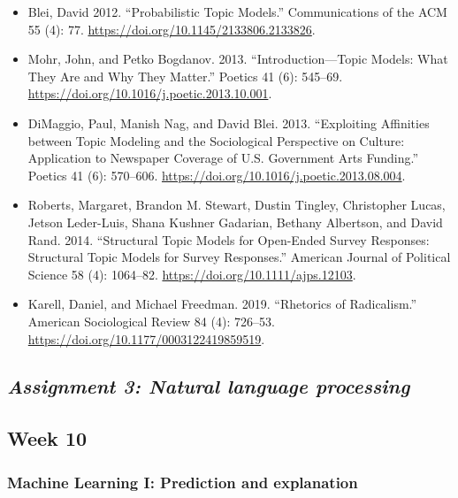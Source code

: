 \documentclass[
  10pt,
]{article}
\providecommand{\tightlist}{%
  \setlength{\itemsep}{0pt}\setlength{\parskip}{0pt}}
\begin{document}
\begin{itemize}
\tightlist
\item
  Blei, David 2012. ``Probabilistic Topic Models.'' Communications of
  the ACM 55 (4): 77. \url{https://doi.org/10.1145/2133806.2133826}.
\item
  Mohr, John, and Petko Bogdanov. 2013. ``Introduction---Topic Models:
  What They Are and Why They Matter.'' Poetics 41 (6): 545--69.
  \url{https://doi.org/10.1016/j.poetic.2013.10.001}.
\item
  DiMaggio, Paul, Manish Nag, and David Blei. 2013. ``Exploiting
  Affinities between Topic Modeling and the Sociological Perspective on
  Culture: Application to Newspaper Coverage of U.S. Government Arts
  Funding.'' Poetics 41 (6): 570--606.
  \url{https://doi.org/10.1016/j.poetic.2013.08.004}.
\item
  Roberts, Margaret, Brandon M. Stewart, Dustin Tingley, Christopher
  Lucas, Jetson Leder-Luis, Shana Kushner Gadarian, Bethany Albertson,
  and David Rand. 2014. ``Structural Topic Models for Open-Ended Survey
  Responses: Structural Topic Models for Survey Responses.'' American
  Journal of Political Science 58 (4): 1064--82.
  \url{https://doi.org/10.1111/ajps.12103}.
\item
  Karell, Daniel, and Michael Freedman. 2019. ``Rhetorics of
  Radicalism.'' American Sociological Review 84 (4): 726--53.
  \url{https://doi.org/10.1177/0003122419859519}.
\end{itemize}

\hypertarget{assignment-3-natural-language-processing}{%
\subsection{\texorpdfstring{\emph{Assignment 3: Natural language
processing}}{Assignment 3: Natural language processing}}\label{assignment-3-natural-language-processing}}

\hypertarget{week-10}{%
\subsection{Week 10}\label{week-10}}

\hypertarget{machine-learning-i-prediction-and-explanation}{%
\subsubsection{Machine Learning I: Prediction and
explanation}\label{machine-learning-i-prediction-and-explanation}}
\end{document}
